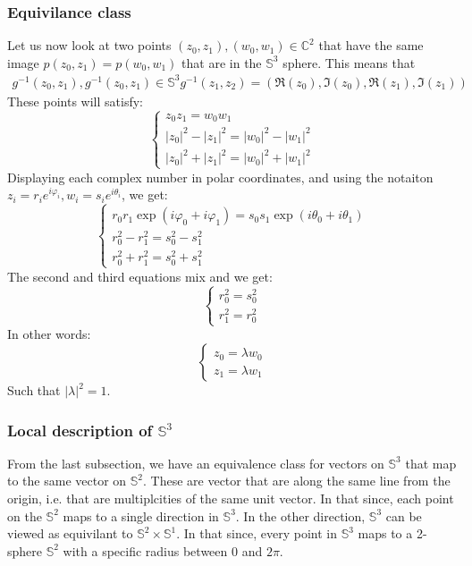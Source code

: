 \documentclass{article}
\begin{document}
\subsubsection{Equivilance class}
Let us now look at two points $(z_0, z_1), (w_0, w_1) \in \mathbb{C}^2$  that have the same image $p(z_0, z_1) = p(w_0, w_1)$ that are in the $\mathbb{S}^3$ sphere. This means that
\begin{equation}
\begin{gathered}
    g^{-1}(z_0,z_1), g^{-1}(z_0,z_1) \in \mathbb{S}^3
    g^{-1}(z_1, z_2) = (\Re(z_0), \Im(z_0), \Re(z_1), \Im(z_1))
\end{gathered}
\end{equation}
These points will satisfy:
\begin{equation}
    \begin{cases}
        z_0z_1 = w_0w_1 \\
        |z_0|^2 - |z_1|^2 = |w_0|^2 - |w_1|^2 \\
        |z_0|^2 + |z_1|^2 = |w_0|^2 + |w_1|^2
    \end{cases}
\end{equation}
Displaying each complex number in polar coordinates, and using the notaiton $z_i = r_i e^{i\varphi_i}, w_i = s_i e^{i\theta_i}$, we get:
\begin{equation}
    \begin{cases}
        r_0r_1 \exp(i\varphi_0 + i\varphi_1) = s_0s_1\exp(i\theta_0 + i\theta_1) \\
        r_0^2 - r_1^2 = s_0^2 - s_1^2 \\
        r_0^2 + r_1^2 = s_0^2 + s_1^2
    \end{cases}
\end{equation}
The second and third equations mix and we get:
\begin{equation}
    \begin{cases}
        r_0^2 = s_0^2 \\
        r_1^2 = r_0^2
    \end{cases}
\end{equation}
In other words:
\begin{equation}
    \begin{cases}
        z_0 = \lambda w_0 \\
        z_1 = \lambda w_1
    \end{cases}
\end{equation}
Such that $|\lambda|^2 = 1$.
\subsubsection{Local description of $\mathbb{S}^3$}
From the last subsection, we have an equivalence class for vectors on $\mathbb{S}^3$ that map to the same vector on $\mathbb{S}^2$. These are vector that are along the same line from the origin, i.e. that are multiplcities of the same unit vector. In that since, each point on the $\mathbb{S}^2$ maps to a single direction in $\mathbb{S}^3$. In the other direction, $\mathbb{S}^3$ can be viewed as equivilant to $\mathbb{S}^2 \times \mathbb{S}^1$. In that since, every point in $\mathbb{S}^3$ maps to a 2-sphere $\mathbb{S}^2$ with a specific radius between 0 and $2\pi$.
\end{document}
